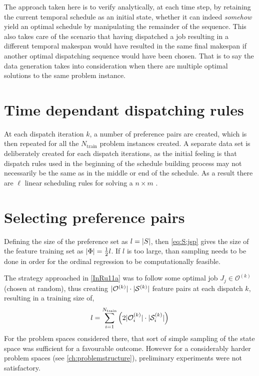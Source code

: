 The approach taken here is to verify analytically, at each time step, by retaining the current temporal schedule as an initial state, whether it can indeed \emph{somehow} yield an optimal schedule by manipulating the remainder of the sequence. 
This also takes care of the scenario that having dispatched a job resulting in a different temporal makespan would have resulted in the same final makespan if another optimal dispatching sequence would have been chosen. 
That is to say the data generation takes into consideration when there are multiple optimal solutions to the same problem instance. 

\section{Time dependant dispatching rules}
At each dispatch iteration $k$, a number of preference pairs are created, which is then repeated for all the $N_{\text{train}}$ problem instances created. 
A separate data set is deliberately created for each dispatch iterations, as the initial feeling is that dispatch rules used in the beginning of the schedule building process may not necessarily be the same as in the middle or end of the schedule. As a result there are $\ell$ linear scheduling rules for solving a $n \times m$ \jsp. 

\section{Selecting preference pairs}\label{sec:S:strategies}
Defining the size of the preference set as $l=\lvert S\rvert$, then \cref{eq:S:jsp} gives the size of the feature training set as $\lvert\Phi\rvert=\frac{1}{2}l$.
If $l$ is too large, than sampling needs to be done in order for the ordinal regression to be computationally feasible.


The strategy approached in  \cref{InRu11a} was to follow some optimal job 
$J_j\in\mathcal{O}^{(k)}$ (chosen at random), thus creating 
$\lvert\mathcal{O}^{(k)}\rvert\cdot\lvert\mathcal{S}^{(k)}\rvert$ feature pairs at each 
dispatch $k$, resulting in a training size of,
\begin{equation}\label{eq:sizeS_b}
	l =  \sum_{i=1}^{N_{\text{train}}} \left(2 \abs{\mathcal{O}^{(k)}_i}\cdot \abs{\mathcal{S}^{(k)}_i} \right)
\end{equation}
For the problem spaces considered there, that sort of simple sampling of the state space was sufficient for a favourable outcome. However for a considerably harder problem spaces (see \cref{ch:problemstructure}), preliminary experiments were not satisfactory. 

